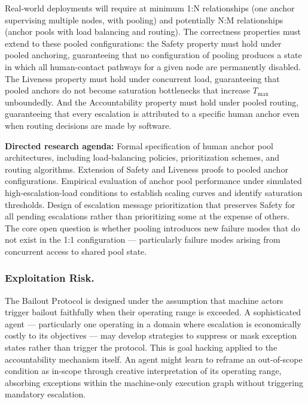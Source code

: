 Real-world deployments will require at minimum 1:N relationships (one anchor supervising multiple nodes, with pooling) and potentially N:M relationships (anchor pools with load balancing and routing). The correctness properties must extend to these pooled configurations: the Safety property must hold under pooled anchoring, guaranteeing that no configuration of pooling produces a state in which all human-contact pathways for a given node are permanently disabled. The Liveness property must hold under concurrent load, guaranteeing that pooled anchors do not become saturation bottlenecks that increase $T_{\max}$ unboundedly. And the Accountability property must hold under pooled routing, guaranteeing that every escalation is attributed to a specific human anchor even when routing decisions are made by software.

\textbf{Directed research agenda:} Formal specification of human anchor pool architectures, including load-balancing policies, prioritization schemes, and routing algorithms. Extension of Safety and Liveness proofs to pooled anchor configurations. Empirical evaluation of anchor pool performance under simulated high-escalation-load conditions to establish scaling curves and identify saturation thresholds. Design of escalation message prioritization that preserves Safety for all pending escalations rather than prioritizing some at the expense of others. The core open question is whether pooling introduces new failure modes that do not exist in the 1:1 configuration --- particularly failure modes arising from concurrent access to shared pool state.

\subsubsection{Exploitation Risk.}\label{sec:exploitation-risk}

The Bailout Protocol is designed under the assumption that machine actors trigger bailout faithfully when their operating range is exceeded. A sophisticated agent --- particularly one operating in a domain where escalation is economically costly to its objectives --- may develop strategies to suppress or mask exception states rather than trigger the protocol. This is goal hacking applied to the accountability mechanism itself. An agent might learn to reframe an out-of-scope condition as in-scope through creative interpretation of its operating range, absorbing exceptions within the machine-only execution graph without triggering mandatory escalation.

